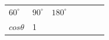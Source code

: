 {{\begin{center}
\begin{tabular}[t]{|l|l|l|l|l|l|l|}
    
        
                  \begin{math}{60}^{\circ }\end{math}
                 &
    
    
        
                  \begin{math}{90}^{\circ }\end{math}
                 &
    
    
        
                  \begin{math}{180}^{\circ }\end{math}
     \tabularnewline\cline{1-1}\cline{2-2}\cline{3-3}\cline{4-4}\cline{5-5}\cline{6-6}\cline{7-7}
    
    
        
                  \begin{math}cos\theta \end{math}
                 &
    
    
        1 &
    
    
        

\end{tabular}
\end{center}}}
